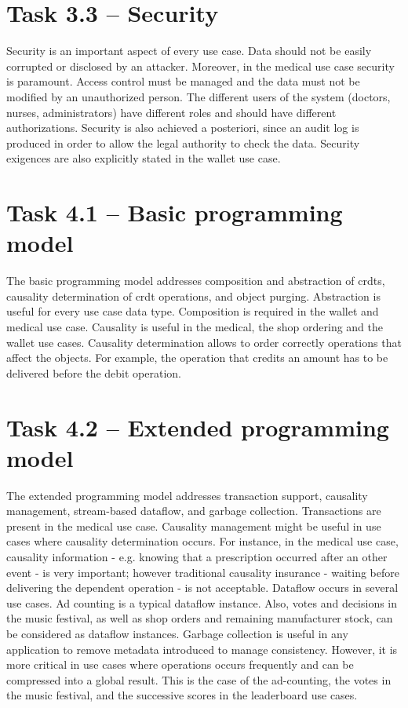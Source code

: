 \documentclass[11pt,a4paper]{report}
\begin{document}
\section{Task 3.3  --  Security}
Security is an important aspect of every use case. Data should not be easily corrupted or disclosed by an attacker. Moreover, in the medical use case security is paramount. Access control must be managed and the data must not be modified by an unauthorized person. The different users of the system (doctors, nurses, administrators) have different roles and should have different authorizations. Security is also achieved a posteriori, since an audit log is produced in order to allow the legal authority to check the data.
Security exigences are also explicitly stated in the wallet use case.  

\section{Task 4.1 --   Basic programming model}
The basic programming model addresses composition and abstraction of \glspl{crdt}, causality determination of \gls{crdt} operations, and object purging. Abstraction is useful for every use case data type. Composition is required in the wallet and medical use case. Causality is useful in the medical, the shop ordering and the wallet use cases. Causality determination allows to order correctly operations that affect the objects. For example, the operation that credits an amount has to be delivered before the debit operation.

\section{Task 4.2 --   Extended programming model}
The extended programming model addresses transaction support, causality management, stream-based dataﬂow, and garbage collection. 
Transactions are present in the medical use case. Causality management might be useful in use cases where causality determination occurs. For instance, in the medical use case, causality information - e.g. knowing that a prescription occurred after an other event - is very important; however traditional causality insurance - waiting before delivering the dependent operation - is not acceptable.        
Dataflow occurs in several use cases. Ad counting is a typical dataflow instance. Also, votes and decisions in the music festival, as well as shop orders and remaining manufacturer stock, can be considered as dataflow instances. 
Garbage collection is useful in any application to remove metadata introduced to manage consistency. However, it is more critical in use cases where operations occurs frequently and can be compressed into a global result. This is the case of the ad-counting, the votes in the music festival, and the successive scores in the leaderboard use cases.  
\end{document}
